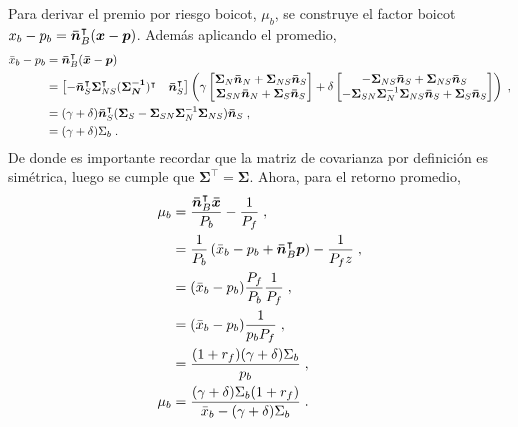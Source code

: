 \documentclass{article}
\begin{document}
Para derivar el premio por riesgo boicot, $\mu_{b}$, se construye el factor boicot $x_{b}-p_{b}=\bm{\Bar{n}}^{\intercal}_{B}(\bm{x}-\bm{p})$. Además aplicando el promedio,
\begin{equation}
	\begin{split}
		\Bar{x}_{b}-p_{b}&=\bm{\Bar{n}}^{\intercal}_{B}(\bm{\Bar{x}}-\bm{p})\\
		&= \begin{bmatrix}
			-\bm{\Bar{n}}^{\intercal}_{S}\bm{\Sigma}^{\intercal}_{NS}(\bm{\Sigma^{-1}_{N}})^{\intercal} & \bm{\Bar{n}}^{\intercal}_{S}
		\end{bmatrix}
		\left(\gamma\begin{bmatrix}
			\bm{\Sigma}_{N}\bm{\Bar{n}}_{N} + \bm{\Sigma}_{NS}\bm{\Bar{n}}_{S}\\
			\bm{\Sigma}_{SN}\bm{\Bar{n}}_{N} + \bm{\Sigma}_{S}\bm{\Bar{n}}_{S}
		\end{bmatrix}
		+\delta\begin{bmatrix}
			-\bm{\Sigma}_{NS}\bm{\Bar{n}}_{S} + \bm{\Sigma}_{NS}\bm{\Bar{n}}_{S}\\
			-\bm{\Sigma}_{SN}\bm{\Sigma}^{-1}_{N}\bm{\Sigma}_{NS}\bm{\Bar{n}}_{S} + \bm{\Sigma}_{S}\bm{\Bar{n}}_{S}
		\end{bmatrix}
		\right)\;,\\
		&= (\gamma+\delta)\bm{\Bar{n}}^{\intercal}_{S}(\bm{\Sigma}_{S} - \bm{\Sigma}_{SN}\bm{\Sigma}^{-1}_{N}\bm{\Sigma}_{NS})\bm{\Bar{n}}_{S}\;,\\
		&= (\gamma+\delta)\Sigma_{b}\;.
	\end{split}
\end{equation}
De donde es importante recordar que la matriz de covarianza por definición es simétrica, luego se cumple que $\bm{\Sigma}^{\intercal} = \bm{\Sigma}$. Ahora, para el retorno promedio,
\begin{equation}
	\begin{split}
		\mu_{b}&=\frac{\bm{\Bar{n}}^{\intercal}_{B}\bm{\bar{x}}}{P_{b}} - \frac{1}{P_f}\;,\\
		&= \frac{1}{P_b}\left(\Bar{x}_{b} - p_b + \bm{\Bar{n}}^{\intercal}_{B}\bm{p}\right)-\frac{1}{P_fz}\;,\\
		&=(\Bar{x}_{b}-p_b)\frac{P_f}{P_b}\frac{1}{P_f}\;,\\
		&=(\Bar{x}_{b}-p_b)\frac{1}{p_b P_f}\;,\\
		&=\frac{(1+r_f)(\gamma + \delta)\Sigma_{b}}{p_b}\;,\\
		\mu_{b}&= \frac{(\gamma + \delta)\Sigma_{b}(1+r_f)}{\Bar{x}_{b}-(\gamma + \delta)\Sigma_{b}}\;.
	\end{split}
	\label{e:mean-returns}
\end{equation}
\end{document}
